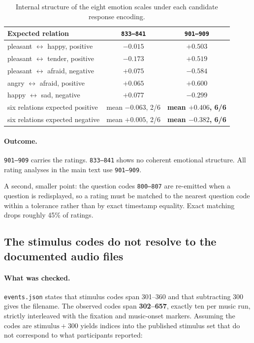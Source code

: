 \begin{table}[htbp]
\centering\small
\caption{Internal structure of the eight emotion scales under each candidate
response encoding.}
\begin{tabular}{lcc}
\toprule
Expected relation & \texttt{833--841} & \texttt{901--909} \\
\midrule
pleasant $\leftrightarrow$ happy, positive  & $-0.015$ & $\mathbf{+0.503}$ \\
pleasant $\leftrightarrow$ tender, positive & $-0.173$ & $\mathbf{+0.519}$ \\
pleasant $\leftrightarrow$ afraid, negative & $+0.075$ & $\mathbf{-0.584}$ \\
angry $\leftrightarrow$ afraid, positive    & $+0.065$ & $\mathbf{+0.600}$ \\
happy $\leftrightarrow$ sad, negative       & $+0.077$ & $\mathbf{-0.299}$ \\
\midrule
six relations expected positive & mean $-0.063$, 2/6 & \textbf{mean $+0.406$, 6/6} \\
six relations expected negative & mean $+0.005$, 2/6 & \textbf{mean $-0.382$, 6/6} \\
\bottomrule
\end{tabular}
\end{table}

\paragraph{Outcome.}
\texttt{901--909} carries the ratings. \texttt{833--841} shows no coherent emotional
structure. All rating analyses in the main text use \texttt{901--909}.

A second, smaller point: the question codes \texttt{800--807} are re-emitted when a
question is redisplayed, so a rating must be matched to the nearest question code
within a tolerance rather than by exact timestamp equality. Exact matching drops
roughly 45\% of ratings.

\subsection{The stimulus codes do not resolve to the documented audio files}

\paragraph{What was checked.}
\texttt{events.json} states that stimulus codes span 301--360 and that subtracting
300 gives the filename. The observed codes span \textbf{302--657}, exactly ten per
music run, strictly interleaved with the fixation and music-onset markers. Assuming
the codes are $\mathrm{stimulus} + 300$ yields indices into the published stimulus
set that do not correspond to what participants reported:

